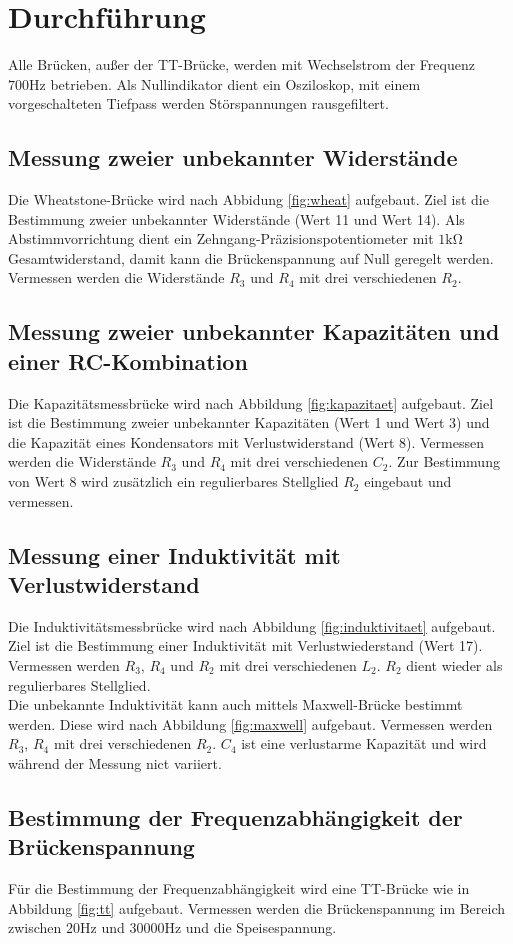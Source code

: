 \section{Durchführung}
\label{sec:Durchführung}
Alle Brücken, außer der TT-Brücke, werden mit Wechselstrom der Frequenz $700\si{\hertz}$ betrieben.
Als Nullindikator dient ein Osziloskop, mit einem vorgeschalteten Tiefpass werden Störspannungen rausgefiltert.
\subsection{Messung zweier unbekannter Widerstände}
Die Wheatstone-Brücke wird nach Abbidung \ref{fig:wheat} aufgebaut. Ziel ist die Bestimmung zweier unbekannter Widerstände (Wert 11 und Wert 14).
Als Abstimmvorrichtung dient ein Zehngang-Präzisionspotentiometer mit $1\si{\kilo\ohm}$ Gesamtwiderstand, damit kann die Brückenspannung auf Null geregelt werden.
Vermessen werden die Widerstände $R_\mathrm{3}$ und $R_\mathrm{4}$ mit drei verschiedenen $R_\mathrm{2}$.
\subsection{Messung zweier unbekannter Kapazitäten und einer RC-Kombination}
Die Kapazitätsmessbrücke wird nach Abbildung \ref{fig:kapazitaet} aufgebaut.
Ziel ist die Bestimmung zweier unbekannter Kapazitäten (Wert 1 und Wert 3) und die Kapazität eines Kondensators mit Verlustwiderstand (Wert 8).
Vermessen werden die Widerstände $R_\mathrm{3}$ und $R_\mathrm{4}$ mit drei verschiedenen $C_\mathrm{2}$.
Zur Bestimmung von Wert 8 wird zusätzlich ein regulierbares Stellglied $R_\mathrm{2}$ eingebaut und vermessen.
\subsection{Messung einer Induktivität mit Verlustwiderstand}
Die Induktivitätsmessbrücke wird nach Abbildung \ref{fig:induktivitaet} aufgebaut.
Ziel ist die Bestimmung einer Induktivität mit Verlustwiederstand (Wert 17).
Vermessen werden $R_\mathrm{3}$, $R_\mathrm{4}$ und $R_\mathrm{2}$ mit drei verschiedenen $L_\mathrm{2}$.
$R_\mathrm{2}$ dient wieder als regulierbares Stellglied.\\
Die unbekannte Induktivität kann auch mittels Maxwell-Brücke bestimmt werden.
Diese wird nach Abbildung \ref{fig:maxwell} aufgebaut.
Vermessen werden $R_\mathrm{3}$, $R_\mathrm{4}$ mit drei verschiedenen $R_\mathrm{2}$.
$C_\mathrm{4}$ ist eine verlustarme Kapazität und wird während der Messung nict variiert.
\subsection{Bestimmung der Frequenzabhängigkeit der Brückenspannung}
Für die Bestimmung der Frequenzabhängigkeit wird eine TT-Brücke wie in Abbildung \ref{fig:tt}
aufgebaut. Vermessen werden die Brückenspannung im Bereich zwischen $20\si{\hertz}$ und $30000\si{\hertz}$ und die Speisespannung.
